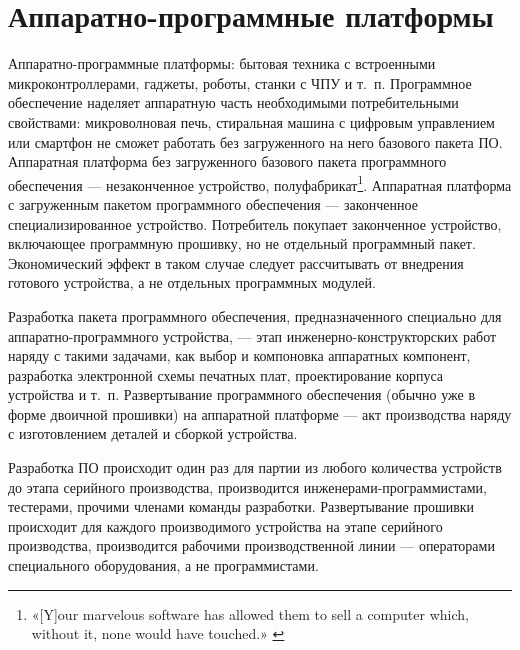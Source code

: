 \documentclass{article}
\begin{document}
\section*{Аппаратно-программные платформы}

Аппаратно-программные платформы: бытовая техника с встроенными микроконтроллерами, гаджеты, роботы, станки с ЧПУ и т.~п. Программное обеспечение наделяет аппаратную часть необходимыми потребительными свойствами: микроволновая печь, стиральная машина с цифровым управлением или смартфон не сможет работать без загруженного на него базового пакета ПО. Аппаратная платформа без загруженного базового пакета программного обеспечения — незаконченное устройство, полуфабрикат\footnote{«[Y]our marvelous software has allowed them to sell a computer which, without it, none would have touched.» \cite{driscollOpenLetter}}. Аппаратная платформа с загруженным пакетом программного обеспечения — законченное специализированное устройство. Потребитель покупает законченное устройство, включающее программную прошивку, но не отдельный программный пакет. Экономический эффект в таком случае следует рассчитывать от внедрения готового устройства, а не отдельных программных модулей.

Разработка пакета программного обеспечения, предназначенного специально для аппаратно-программного устройства, — этап инженерно-конструкторских работ наряду с такими задачами, как выбор и компоновка аппаратных компонент, разработка электронной схемы печатных плат, проектирование корпуса устройства и т.~п. Развертывание программного обеспечения (обычно уже в форме двоичной прошивки) на аппаратной платформе — акт производства наряду с изготовлением деталей и сборкой устройства. 

Разработка ПО происходит один раз для партии из любого количества устройств до этапа серийного производства, производится инженерами-программистами, тестерами, прочими членами команды разработки. Развертывание прошивки происходит для каждого производимого устройства на этапе серийного производства, производится рабочими производственной линии — операторами специального оборудования, а не программистами.
\end{document}
